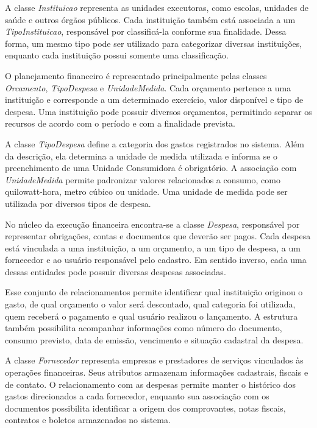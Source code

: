A classe \textit{Instituicao} representa as unidades executoras, como escolas, unidades de saúde e outros órgãos públicos. Cada instituição também está associada a um \textit{TipoInstituicao}, responsável por classificá-la conforme sua finalidade. Dessa forma, um mesmo tipo pode ser utilizado para categorizar diversas instituições, enquanto cada instituição possui somente uma classificação.

O planejamento financeiro é representado principalmente pelas classes \textit{Orcamento}, \textit{TipoDespesa} e \textit{UnidadeMedida}. Cada orçamento pertence a uma instituição e corresponde a um determinado exercício, valor disponível e tipo de despesa. Uma instituição pode possuir diversos orçamentos, permitindo separar os recursos de acordo com o período e com a finalidade prevista.

A classe \textit{TipoDespesa} define a categoria dos gastos registrados no sistema. Além da descrição, ela determina a unidade de medida utilizada e informa se o preenchimento de uma Unidade Consumidora é obrigatório. A associação com \textit{UnidadeMedida} permite padronizar valores relacionados a consumo, como quilowatt-hora, metro cúbico ou unidade. Uma unidade de medida pode ser utilizada por diversos tipos de despesa.

No núcleo da execução financeira encontra-se a classe \textit{Despesa}, responsável por representar obrigações, contas e documentos que deverão ser pagos. Cada despesa está vinculada a uma instituição, a um orçamento, a um tipo de despesa, a um fornecedor e ao usuário responsável pelo cadastro. Em sentido inverso, cada uma dessas entidades pode possuir diversas despesas associadas.

Esse conjunto de relacionamentos permite identificar qual instituição originou o gasto, de qual orçamento o valor será descontado, qual categoria foi utilizada, quem receberá o pagamento e qual usuário realizou o lançamento. A estrutura também possibilita acompanhar informações como número do documento, consumo previsto, data de emissão, vencimento e situação cadastral da despesa.

A classe \textit{Fornecedor} representa empresas e prestadores de serviços vinculados às operações financeiras. Seus atributos armazenam informações cadastrais, fiscais e de contato. O relacionamento com as despesas permite manter o histórico dos gastos direcionados a cada fornecedor, enquanto sua associação com os documentos possibilita identificar a origem dos comprovantes, notas fiscais, contratos e boletos armazenados no sistema.


